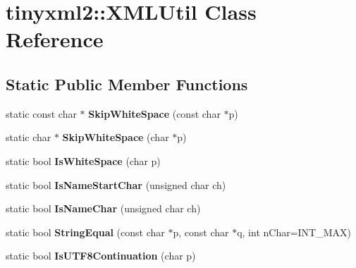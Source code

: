 \hypertarget{classtinyxml2_1_1_x_m_l_util}{}\section{tinyxml2\+:\+:X\+M\+L\+Util Class Reference}
\label{classtinyxml2_1_1_x_m_l_util}
\subsection*{Static Public Member Functions}
\begin{DoxyCompactItemize}
\item 
static const char $\ast$ {\bfseries Skip\+White\+Space} (const char $\ast$p)\hypertarget{classtinyxml2_1_1_x_m_l_util_a9333d20f2a34325b5115ca45849c4b2a}{}\label{classtinyxml2_1_1_x_m_l_util_a9333d20f2a34325b5115ca45849c4b2a}

\item 
static char $\ast$ {\bfseries Skip\+White\+Space} (char $\ast$p)\hypertarget{classtinyxml2_1_1_x_m_l_util_aa48025be8843ec5a79b65579d31bd8fc}{}\label{classtinyxml2_1_1_x_m_l_util_aa48025be8843ec5a79b65579d31bd8fc}

\item 
static bool {\bfseries Is\+White\+Space} (char p)\hypertarget{classtinyxml2_1_1_x_m_l_util_a357ec3af8fc433d19023a815f45e8e33}{}\label{classtinyxml2_1_1_x_m_l_util_a357ec3af8fc433d19023a815f45e8e33}

\item 
static bool {\bfseries Is\+Name\+Start\+Char} (unsigned char ch)\hypertarget{classtinyxml2_1_1_x_m_l_util_abe106a69ac4d942a4381a4d9dfd0e0bd}{}\label{classtinyxml2_1_1_x_m_l_util_abe106a69ac4d942a4381a4d9dfd0e0bd}

\item 
static bool {\bfseries Is\+Name\+Char} (unsigned char ch)\hypertarget{classtinyxml2_1_1_x_m_l_util_a04b17341538fa11752f24b4301d19485}{}\label{classtinyxml2_1_1_x_m_l_util_a04b17341538fa11752f24b4301d19485}

\item 
static bool {\bfseries String\+Equal} (const char $\ast$p, const char $\ast$q, int n\+Char=I\+N\+T\+\_\+\+M\+AX)\hypertarget{classtinyxml2_1_1_x_m_l_util_acfcd287cacfd2533e1bc9ea4dfb56602}{}\label{classtinyxml2_1_1_x_m_l_util_acfcd287cacfd2533e1bc9ea4dfb56602}

\item 
static bool {\bfseries Is\+U\+T\+F8\+Continuation} (char p)\hypertarget{classtinyxml2_1_1_x_m_l_util_ad7fd82e0fe610d73ef7bf9f359f104a3}{}\label{classtinyxml2_1_1_x_m_l_util_ad7fd82e0fe610d73ef7bf9f359f104a3}


\end{DoxyCompactItemize}
